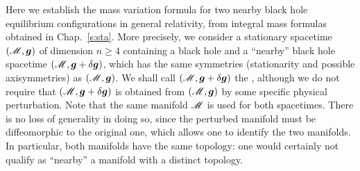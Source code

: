 Here we establish the mass variation formula for two nearby black hole
equilibrium configurations in general relativity,
from integral mass formulas obtained in Chap.~\ref{s:sta}.
More precisely, we consider a stationary spacetime $(\mathscr{M},\bm{g})$ of dimension $n\geq 4$
containing
a black hole and a ``nearby'' black hole spacetime $(\mathscr{M},\bm{g}+\delta\bm{g})$, which has the
same symmetries (stationarity and possible axisymmetries) as $(\mathscr{M},\bm{g})$.
We shall call $(\mathscr{M},\bm{g}+\delta\bm{g})$ the ,
although we do not require that $(\mathscr{M},\bm{g}+\delta\bm{g})$ is obtained from
$(\mathscr{M},\bm{g})$ by some specific physical perturbation.
Note that the same manifold $\mathscr{M}$ is used for both spacetimes.
There is no loss of generality in doing so, since the perturbed manifold
must be diffeomorphic to the original one, which allows one to
identify the two manifolds. In particular, both manifolds have the same
topology: one would certainly not qualify as ``nearby'' a manifold with a distinct topology.



